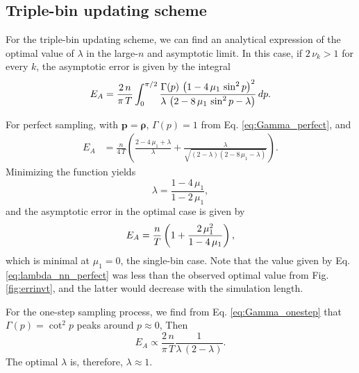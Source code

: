 \documentclass[reprint, floatfix]{revtex4-1}
\newcommand{\Err}{E}
\begin{document}
\subsection{\label{sec:invt_nn}
Triple-bin updating scheme}




For the triple-bin updating scheme,
we can find an analytical expression
of the optimal value of $\lambda$
in the large-$n$ and asymptotic limit.
%
In this case,
if $2 \, \nu_k > 1$ for every $k$,
the asymptotic error is given by the integral
%
\begin{align}
  \Err_A
  =
  \frac{ 2 \, n  }
       { \pi \, T }
  \int_0^{\pi/2}
    \frac{ \Gamma(p) \, \left(1 - 4 \, \mu_1 \, \sin^2 p \right)^2    }
         {   \lambda \, \left(2 - 8 \, \mu_1 \, \sin^2 p - \lambda \right) }
  \, dp
  .
\notag
\end{align}



For perfect sampling, with $\mathbf p = \pmb \rho$,
$\Gamma(p) = 1$ from Eq. \eqref{eq:Gamma_perfect},
and
$$
\begin{aligned}
  \Err_A
  &=
  \frac{n}{4 \, T}
  \left(
    \frac{2 - 4 \, \mu_1 + \lambda}{ \lambda }
    +
    \frac{ \lambda }
    { \sqrt{ (2 - \lambda) (2 - 8 \, \mu_1 - \lambda) } }
  \right)
.
\end{aligned}
$$
%
Minimizing the function yields
%
\begin{equation}
  \lambda
  =
  \frac{ 1 - 4 \, \mu_1 }
       { 1 - 2 \, \mu_1 }
  ,
\label{eq:lambda_nn_perfect}
\end{equation}
%
and the asymptotic error in the optimal case is given by
%
\begin{equation}
  \Err_A
  =
  \frac{n}{T}
  \left(
    1+ \frac{2 \, \mu_1^2}{1-4 \, \mu_1}
  \right)
  ,
\notag
\end{equation}
%
which
is minimal at $\mu_1 = 0$, the single-bin case.
%
Note that the value given by
Eq. \eqref{eq:lambda_nn_perfect}
was less than the observed optimal value
from Fig. \ref{fig:errinvt},
and the latter would decrease
with the simulation length.
%




For the one-step sampling process,
we find from Eq. \eqref{eq:Gamma_onestep}
that $\Gamma(p) = \cot^2 p$
peaks around $p \approx 0$,
%
Then
$$
  \Err_A
  \propto
  \frac{   2 \, n }
       { \pi \, T }
  \frac{             1             }
       {  \lambda \, (2 - \lambda) }
  .
$$
%
The optimal $\lambda$ is, therefore,
%
$
  \lambda \approx 1.
$
%
\end{document}
